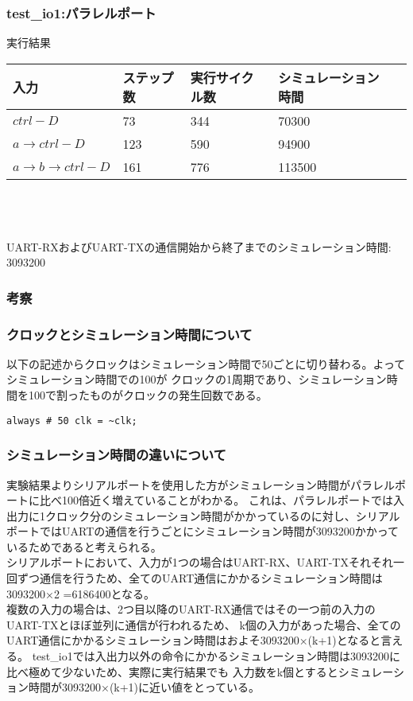 \documentclass{jsarticle}
\begin{document}
\subsubsection*{test\_io1:パラレルポート}
実行結果
\begin{table}[h]
  \begin{tabular}{|l|l|l|l|l|} \hline
    入力 & ステップ数 & 実行サイクル数 & シミュレーション時間 \\ \hline
    $ctrl-D$ & 73 & 344 & 70300 \\ \hline
    $a→ctrl-D$ & 123 & 590 & 94900 \\ \hline
    $a→b→ctrl-D$ & 161 & 776 & 113500 \\ \hline
  \end{tabular}
\end{table}
\\
\\
\\
UART-RXおよびUART-TXの通信開始から終了までのシミュレーション時間: 3093200

\subsubsection*{考察}

\subsubsection*{クロックとシミュレーション時間について}
以下の記述からクロックはシミュレーション時間で50ごとに切り替わる。よってシミュレーション時間での100が
クロックの1周期であり、シミュレーション時間を100で割ったものがクロックの発生回数である。 \\

\begin{lstlisting}[caption=test\_fpga\_ex3.v 92行目]
always # 50 clk = ~clk;
\end{lstlisting}

\subsubsection*{シミュレーション時間の違いについて}
実験結果よりシリアルポートを使用した方がシミュレーション時間がパラレルポートに比べ100倍近く増えていることがわかる。
これは、パラレルポートでは入出力に1クロック分のシミュレーション時間がかかっているのに対し、シリアルポートではUARTの通信を行うごとにシミュレーション時間が3093200かかっているためであると考えられる。 \\
シリアルポートにおいて、入力が1つの場合はUART-RX、UART-TXそれそれ一回ずつ通信を行うため、全てのUART通信にかかるシミュレーション時間は3093200×2 =6186400となる。 \\
複数の入力の場合は、2つ目以降のUART-RX通信ではその一つ前の入力のUART-TXとほぼ並列に通信が行われるため、
k個の入力があった場合、全てのUART通信にかかるシミュレーション時間はおよそ3093200×(k+1)となると言える。
test\_io1では入出力以外の命令にかかるシミュレーション時間は3093200に比べ極めて少ないため、実際に実行結果でも
入力数をk個とするとシミュレーション時間が3093200×(k+1)に近い値をとっている。 \\
\end{document}
